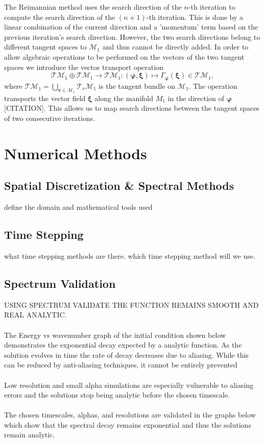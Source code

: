 \documentclass[12pt]{article}
\def\v{\boldsymbol v}
\def\bx{\boldsymbol \xi}
\def\bp{\boldsymbol \varphi}
\def\M{\mathcal{M}}
\def\T{\mathcal{T}}
\numberwithin{equation}{section}
\begin{document}
The Reimannian method uses the search direction of the $n$-th iteration to compute the search direction of the $(n+1)$-th iteration. This is done by a linear combination of the current direction and a 'momentum' term based on the previous iteration's search direction. However, the two search directions belong to different tangent spaces to $\M_1$ and thus cannot be directly added. In order to allow algebraic operations to be performed on the vectors of the two tangent spaces we introduce the vector transport operation
$$\T\M_1 \oplus \T\M_1 \rightarrow \T\M_1: (\bp,\bx)\mapsto \Gamma_{\bp}(\bx)\in \T\M_1, $$
where $\T\M_1 = \bigcup_{\v\in\M_1}\T_v\M_1$ is the tangent bundle on $\M_1$. The operation transports the vector field $\bx$ along the manifold $M_1$ in the direction of $\bp$ [CITATION]. This allows us to map search directions between the tangent spaces of two consecutive iterations.

\section{Numerical Methods}
\subsection{Spatial Discretization \& Spectral Methods}
define the domain and mathematical tools used

\subsection{Time Stepping}
what time stepping methods are there.
which time stepping method will we use.

\subsection{Spectrum Validation}

USING SPECTRUM VALIDATE THE FUNCTION REMAINS SMOOTH AND REAL ANALYTIC.
\\~\\
The Energy vs wavenumber graph of the initial condition shown below demonstrates the exponential decay expected by a analytic function. As the solution evolves in time the rate of decay decreases due to aliasing. While this can be reduced by anti-aliasing techniques, it cannot be entirely prevented
\\~\\
Low resolution and small alpha simulations are especially vulnerable to aliasing errors and the solutions stop being analytic before the chosen timescale.
\\~\\
The chosen timescales, alphas, and resolutions are validated in the graphs below which show that the spectral decay remains exponential and thus the solutions remain analytic.
\end{document}
